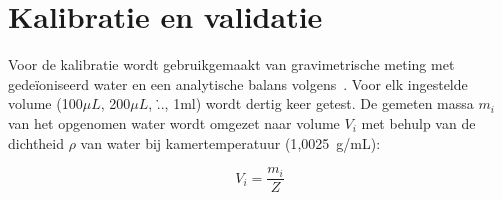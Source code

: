 \section{Kalibratie en validatie}
Voor de kalibratie wordt gebruikgemaakt van gravimetrische meting met gedeïoniseerd water en een analytische balans volgens\ \cite{RN50}.
Voor elk ingestelde volume (100$\mu L$, 200$\mu L$, \..., 1ml) wordt dertig keer getest. De gemeten massa $m_i$
van het opgenomen water wordt omgezet naar volume $V_i$ met behulp van de dichtheid $\rho$ van water bij kamertemperatuur (1{,}0025~g/mL):

\begin{equation} V_i = \frac{m_i}{Z} \end{equation}


